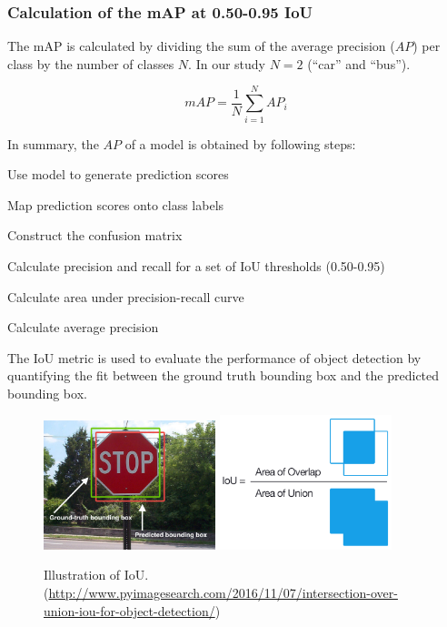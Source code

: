 \documentclass[]{article}
\begin{document}
\subsubsection{Calculation of the mAP at 0.50-0.95 IoU}

	The mAP is calculated by dividing the sum of the average precision ($AP$) per class by the number of classes $N$.  In our study $N = 2$ (``car'' and ``bus'').
	
	\[
	mAP = \frac{1}{N} \sum_{i=1}^{N} AP_i
	\]
	
	In summary, the $AP$ of a model is obtained by following steps:
	
	\begin{center}
		\begin{compactenum}
			\item Use model to generate prediction scores
			\item Map prediction scores onto class labels
			\item Construct the confusion matrix
			\item Calculate precision and recall for a set of IoU thresholds (0.50-0.95)
			\item Calculate area under precision-recall curve
			\item Calculate average precision
		\end{compactenum}
	\end{center}
	
	The IoU metric is used to evaluate the performance of object detection by quantifying the fit between the ground truth bounding box and the predicted bounding box.
	
	\begin{figure}[h]
		\centering
		\includegraphics[width=5cm]{Intersection_over_Union_-_object_detection_bounding_boxes.jpg}
		\includegraphics[width=5cm]{Intersection_over_Union_-_visual_equation.png}
		\caption{Illustration of IoU.\\ \footnotesize{(\url{http://www.pyimagesearch.com/2016/11/07/intersection-over-union-iou-for-object-detection/})}}
	\end{figure}
	
\end{document}
